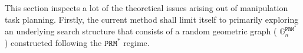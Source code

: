 This section inspects a lot of the theoretical issues arising out of manipulation task planning. Firstly, the current method shall limit itself to primarily exploring an underlying search structure that consists of a random geometric graph  ( $\mathbb{G}_n^{\mathtt{PRM^*}}$ ) constructed following the $\mathtt{PRM^*}$ \cite{Karaman2011Sampling-based-} regime.

